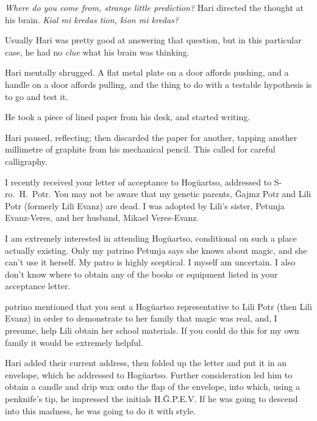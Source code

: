 \emph{Where do you come from, strange little prediction?} Hari directed the thought at his brain. \emph{Kial mi kredas tion, kion mi kredas?}

Usually Hari was pretty good at answering that question, but in this particular case, he had no \emph{clue} what his brain was thinking.

Hari mentally shrugged. A flat metal plate on a door affords pushing, and a handle on a door affords pulling, and the thing to do with a testable hypothesis is to go and test it.

He took a piece of lined paper from his desk, and started writing.

\begin{writtenNote}
\end{writtenNote}

Hari paused, reflecting; then discarded the paper for another, tapping another millimetre of graphite from his mechanical pencil. This called for careful calligraphy.

\begin{writtenNote}


I recently received your letter of acceptance to Hogŭartso, addressed to S\nobreakdash-ro.~H.~Potr. You may not be aware that my genetic parents, Ĝajmz Potr and Lili Potr (formerly Lili Evanz) are dead. I was adopted by Lili’s sister, Petunja Evanz-Veres, and her husband, Mikael Veres-Evanz.

I am extremely interested in attending Hogŭartso, conditional on such a place actually existing. Only my patrino Petunja says she knows about magic, and she can’t use it herself. My patro is highly sceptical. I myself am uncertain. I also don’t know where to obtain any of the books or equipment listed in your acceptance letter.

patrino mentioned that you sent a Hogŭartso representative to Lili Potr (then Lili Evanz) in order to demonstrate to her family that magic was real, and, I presume, help Lili obtain her school materials. If you could do this for my own family it would be extremely helpful.

\end{writtenNote}

Hari added their current address, then folded up the letter and put it in an envelope, which he addressed to Hogŭartso. Further consideration led him to obtain a candle and drip wax onto the flap of the envelope, into which, using a penknife’s tip, he impressed the initials H.Ĝ.P.E.V\@. If he was going to descend into this madness, he was going to do it with style.

